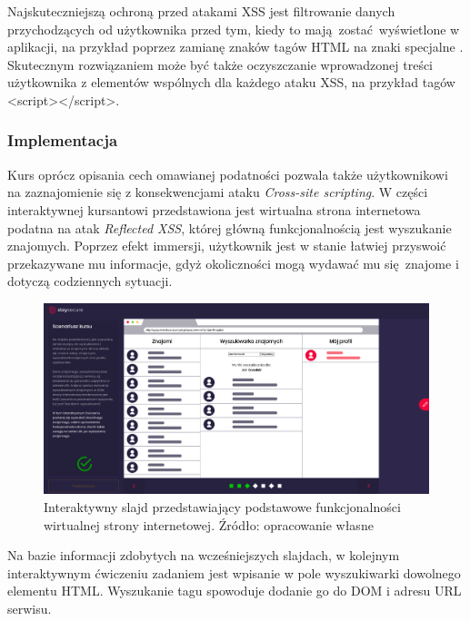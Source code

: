 \documentclass[12pt,twoside]{article}
\begin{document}
Najskuteczniejszą ochroną przed atakami XSS jest filtrowanie danych przychodzących od użytkownika przed tym, kiedy to mają zostać wyświetlone w aplikacji, na przykład poprzez zamianę znaków tagów HTML na znaki specjalne \cite{XSSSpecialTags}. Skutecznym rozwiązaniem może być także oczyszczanie wprowadzonej treści użytkownika z elementów wspólnych dla każdego ataku XSS, na przykład tagów <script></script>.
	
\subsubsection{Implementacja}

Kurs oprócz opisania cech omawianej podatności pozwala także użytkownikowi na zaznajomienie się z konsekwencjami ataku \emph{Cross-site scripting}. W części interaktywnej kursantowi przedstawiona jest wirtualna strona internetowa podatna na atak \emph{Reflected XSS}, której główną funkcjonalnością jest wyszukanie znajomych. Poprzez efekt immersji, użytkownik jest w stanie łatwiej przyswoić przekazywane mu informacje, gdyż okoliczności mogą wydawać mu się znajome i dotyczą codziennych sytuacji.

\begin{figure}[H]
	\centering
	\includegraphics[width=1\linewidth]{figures/xss-slide-screenshot1}
	\caption{Interaktywny slajd przedstawiający podstawowe funkcjonalności wirtualnej strony internetowej. Źródło: opracowanie własne}
\end{figure}

Na bazie informacji zdobytych na wcześniejszych slajdach, w kolejnym interaktywnym ćwiczeniu zadaniem jest wpisanie w pole wyszukiwarki dowolnego elementu HTML. Wyszukanie tagu spowoduje dodanie go do DOM i adresu URL serwisu.
\end{document}
